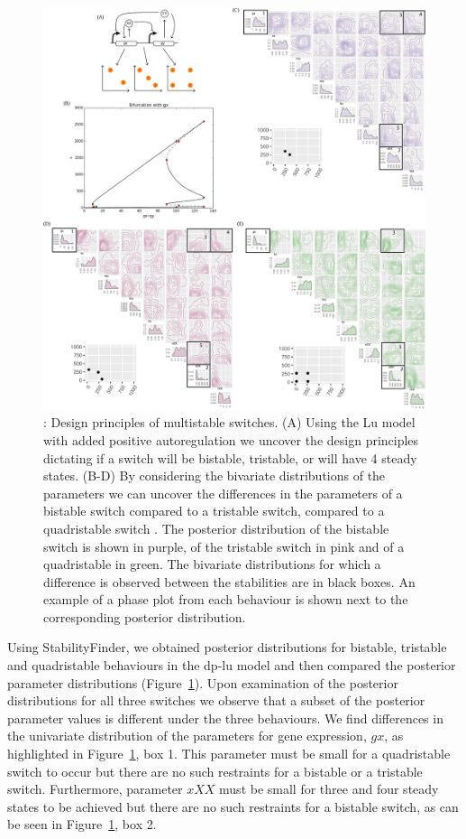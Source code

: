 \begin{figure}
	\centerfloat
		\includegraphics[scale=0.45]{../../chapters/chapterStabilityFinder/images/Lu_234.png}
		\caption[ Design principles of multistable switches]{ \label{fig:lu_234}: Design principles of multistable switches. (A) Using the Lu model with added positive autoregulation we uncover the design principles dictating if a switch will be bistable, tristable, or will have 4 steady states. (B-D) By considering the bivariate distributions of the parameters we can uncover the differences in the parameters of a bistable switch compared to a tristable switch, compared to a quadristable switch . The posterior distribution of the bistable switch is shown in purple, of the tristable switch in pink and of a quadristable in green. The bivariate distributions for which a difference is observed between the stabilities are in black boxes. An example of a phase plot from each behaviour is shown next to the corresponding posterior distribution.}
\end{figure}



 Using StabilityFinder, we obtained posterior distributions for bistable, tristable and quadristable behaviours in the \acrshort{dp-lu} model and then compared the posterior parameter distributions (Figure~\ref{fig:lu_234}). Upon examination of the posterior distributions for all three switches we observe that a subset of the posterior parameter values is different under the three behaviours. We find differences in the univariate distribution of the parameters for gene expression, $gx$, as highlighted in Figure~\ref{fig:lu_234}, box 1. This parameter must be small for a quadristable switch to occur but there are no such restraints for a bistable or a tristable switch. Furthermore, parameter $xXX$ must be small for three and four steady states to be achieved but there are no such restraints for a bistable switch, as can be seen in Figure~\ref{fig:lu_234}, box 2. 

